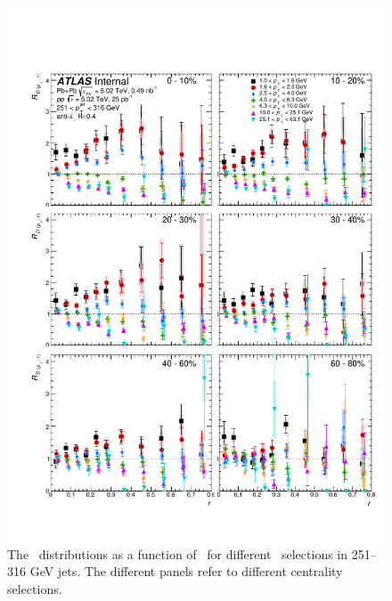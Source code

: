\begin{figure}[h]
\includegraphics[width=1.0\textwidth]{figures/results/RDpT_dR_jet10}
\caption{The \RDptr\ distributions as a function of \rvar\ for different \pt\ selections in 251--316 GeV jets. The different panels refer to different centrality selections.}
\label{fig:fullset_drtr_j10}
\end{figure}

